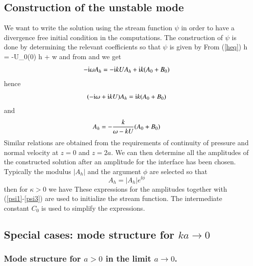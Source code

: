 \subsection{Construction of the unstable mode}

We want to write the solution using the stream function $\psi$
in order to have a divergence free initial condition in the computations. 
The construction of $\psi$ is done by determining the relevant coefficients
so that $\psi$ is given by
From (\ref{heq}) 
\be
\dert h =  -U_0(0) \derx h + w \label{htw}
\nd
and from  and   
we get
$$
- {\rm i} {\omega}  A_h = -{\rm i} k U  A_h +  {\rm i} k (A_0 + B_0)
$$
hence
$$
(- {\rm i} {\omega} + {\rm i} k U)  A_h =  {\rm i} k (A_0 + B_0)
$$
and
$$
A_h = - \frac{k}{{\omega}-kU} (A_0 + B_0) 
$$
Similar relations are obtained from the requirements of continuity of pressure
and normal velocity at $z=0$ and $z=2a$. 
We can then determine all the amplitudes of the constructed solution
after an amplitude for the interface has been chosen. Typically
the modulus $|A_h|$  and the argument $\phi$ are selected so that
$$A_h = | A_h | e^{\ii \phi}$$
then for $\kappa>0$ we have
These expressions for the amplitudes together with (\ref{psi1}-\ref{psi3}) are used to
initialize the stream function. The intermediate constant $C_0$ is used to simplify the expressions.

\subsection{Special cases: mode structure for $ka \rightarrow 0$}

\subsubsection{Mode structure for $a>0$ in the limit $a \rightarrow  0$.}

